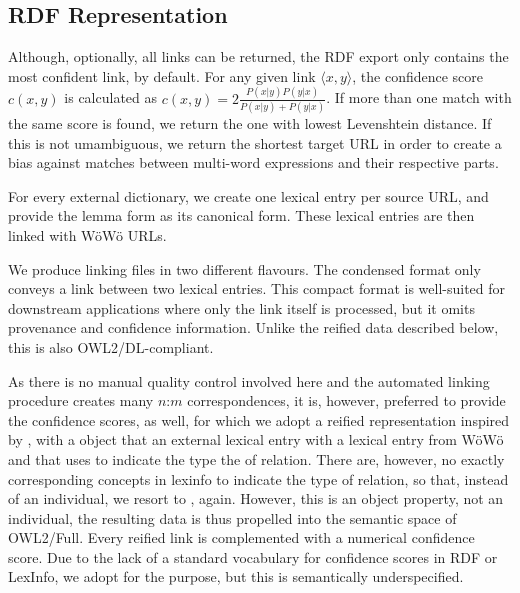 \subsection{RDF Representation}

Although, optionally, all links can be returned, the RDF export only contains the most confident link, by default. For any given link $\langle x,y\rangle$, the confidence score $c(x,y)$ is calculated as $c(x,y)=2 \frac{P(x|y) P(y|x)}{P(x|y) + P(y|x)}$. If more than one match with the same score is found, we return the one with lowest Levenshtein distance. If this is not umambiguous, we return the shortest target URL in order to create a bias against matches between multi-word expressions and their respective parts.

For every external dictionary, we create one lexical entry per source URL, and provide the lemma form as its canonical form. These lexical entries are then linked with WöWö URLs.

We produce linking files in two different flavours. The condensed format only conveys a  link between two lexical entries. %
This compact format is well-suited for downstream applications where only the link itself is processed, but it omits provenance and confidence information. Unlike the reified data described below, this is also OWL2/DL-compliant. 

As there is no manual quality control involved here and the automated linking procedure creates many $n$:$m$ correspondences, it is, however, preferred to provide the confidence scores, as well, for which we adopt a reified representation inspired by \citet{gillis2023refinement}, with a  object that  an external lexical entry with a lexical entry from WöWö and that uses  to indicate the type the of relation. There are, however, no exactly corresponding concepts in lexinfo to indicate the type of relation, so that, instead of an individual, we resort to , again. However, this is an object property, not an individual, the resulting data is thus propelled into the semantic space of OWL2/Full.
Every reified link is complemented with a numerical confidence score. Due to the lack of a standard vocabulary for confidence scores in RDF or LexInfo, we adopt  for the purpose, but this is semantically underspecified. %

